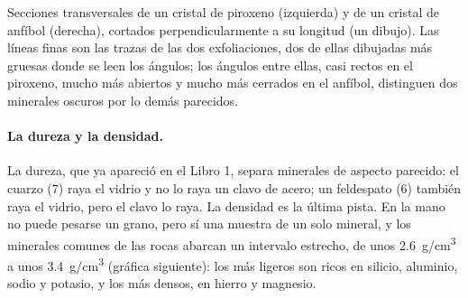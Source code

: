 \begin{omfigure}

{\small Secciones transversales de un cristal de piroxeno (izquierda) y de un
cristal de anfíbol (derecha), cortados perpendicularmente a su longitud (un
dibujo). Las líneas finas son las trazas de las dos exfoliaciones, dos de
ellas dibujadas más gruesas donde se leen los ángulos; los ángulos entre ellas, casi rectos en el piroxeno, mucho más abiertos y mucho más cerrados en el anfíbol, distinguen
dos minerales oscuros por lo demás parecidos.}
\end{omfigure}

\paragraph{La dureza y la densidad.} La dureza, que ya apareció en el Libro 1,
separa minerales de aspecto parecido: el cuarzo (7) raya el vidrio y no lo
raya un clavo de acero; un feldespato (6) también raya el vidrio, pero el
clavo lo raya. La densidad es la última pista. En la mano no puede pesarse un
grano, pero sí una muestra de un solo mineral, y los minerales comunes de las
rocas abarcan un intervalo estrecho, de unos \qty{2.6}{g/cm^3} a unos
\qty{3.4}{g/cm^3} (gráfica siguiente): los más ligeros son ricos en silicio,
aluminio, sodio y potasio, y los más densos, en hierro y magnesio.

